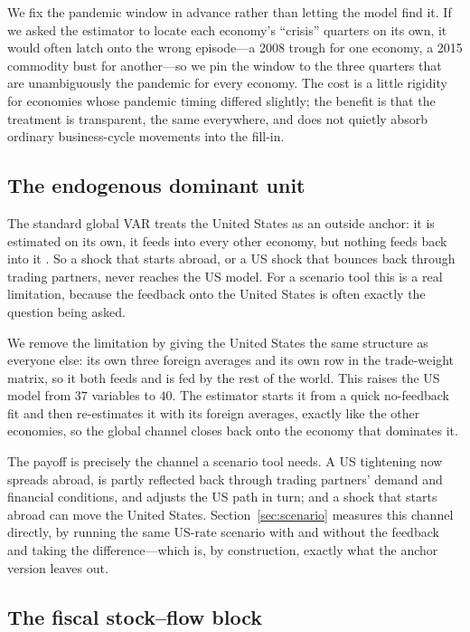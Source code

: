 \documentclass[11pt]{article}
\begin{document}
We fix the pandemic window in advance rather than letting the model find it. If we asked the estimator to
locate each economy's ``crisis'' quarters on its own, it would often latch onto the wrong episode---a 2008
trough for one economy, a 2015 commodity bust for another---so we pin the window to the three quarters
that are unambiguously the pandemic for every economy. The cost is a little rigidity for economies whose
pandemic timing differed slightly; the benefit is that the treatment is transparent, the same everywhere,
and does not quietly absorb ordinary business-cycle movements into the fill-in.

\subsection{The endogenous dominant unit}
\label{sub:endous}

The standard global VAR treats the United States as an outside anchor: it is estimated on its own, it
feeds into every other economy, but nothing feeds back into it
\citep{PesaranSchuermannWeiner2004,DeesDiMauroPesaranSmith2007}. So a shock that starts abroad, or a US
shock that bounces back through trading partners, never reaches the US model. For a scenario tool this is
a real limitation, because the feedback onto the United States is often exactly the question being asked.

We remove the limitation by giving the United States the same structure as everyone else: its own three
foreign averages and its own row in the trade-weight matrix, so it both feeds and is fed by the rest of
the world. This raises the US model from $37$ variables to $40$. The estimator starts it from a quick
no-feedback fit and then re-estimates it with its foreign averages, exactly like the other economies, so
the global channel closes back onto the economy that dominates it.

The payoff is precisely the channel a scenario tool needs. A US tightening now spreads abroad, is
partly reflected back through trading partners' demand and financial conditions, and adjusts the US path
in turn; and a shock that starts abroad can move the United States. Section~\ref{sec:scenario} measures
this channel directly, by running the same US-rate scenario with and without the feedback and taking the
difference---which is, by construction, exactly what the anchor version leaves out.

\subsection{The fiscal stock--flow block}
\label{sub:fiscal}
\end{document}
